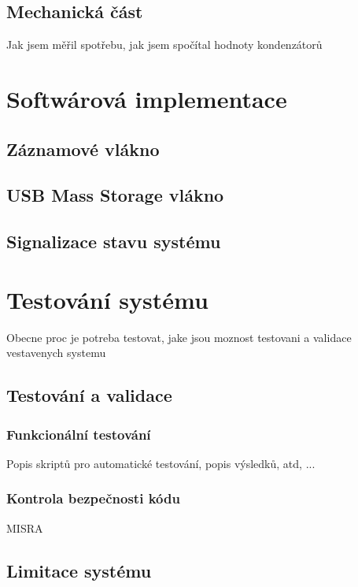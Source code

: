 \section{Mechanická část}
Jak jsem měřil spotřebu, jak jsem spočítal hodnoty kondenzátorů

\chapter{Softwárová implementace}

\section{Záznamové vlákno}

\section{USB Mass Storage vlákno}

\section{Signalizace stavu systému}

\chapter{Testování systému}
Obecne proc je potreba testovat, jake jsou moznost testovani a validace vestavenych systemu


\section{Testování a validace}

\subsection{Funkcionální testování}
Popis skriptů pro automatické testování, popis výsledků, atd, ...

\subsection{Kontrola bezpečnosti kódu}
MISRA


\section{Limitace systému}
\label{limitace}

